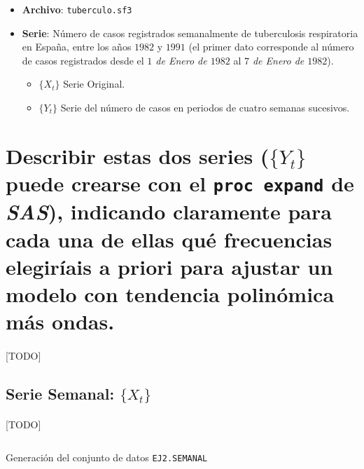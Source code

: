 \documentclass[a4paper, spanish]{article}
\begin{document}
  \maketitle

  \begin{itemize}
    \item \textbf{Archivo}: \texttt{tuberculo.sf3}
    \item \textbf{Serie}: Número de casos registrados semanalmente de tuberculosis respiratoria en España, entre los años $1982$ y $1991$ (el primer dato corresponde al número de casos registrados desde el \emph{$1$ de Enero de $1982$} al \emph{$7$ de Enero de $1982$}).
    \begin{itemize}
      \item $\{X_t\}$ Serie Original.
      \item $\{Y_t\}$ Serie del número de casos en periodos de cuatro semanas sucesivos.
    \end{itemize}
  \end{itemize}

  \section{Describir estas dos series ($\{Y_t\}$ puede crearse con el \texttt{proc expand} de \emph{SAS}), indicando claramente para cada una de ellas qué frecuencias elegiríais a priori para ajustar un modelo con tendencia polinómica más ondas.}
  \label{sec:a}

    \paragraph{}
    [TODO]

    \subsection{Serie Semanal: $\{X_t\}$}

      \paragraph{}
      [TODO]

      \begin{listing}[htb!]
        \centering
        \inputminted{SAS}{./res/code/a-01-data.sas}
        \caption{Generación del conjunto de datos \texttt{EJ2.SEMANAL}}
        \label{code:a_data}
      \end{listing}
\end{document}
